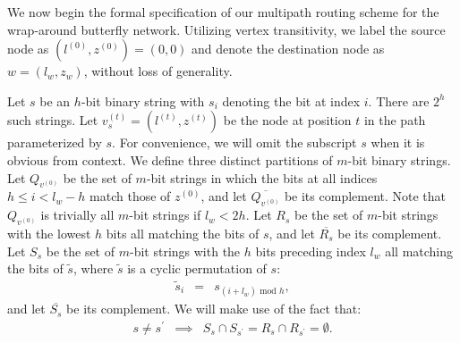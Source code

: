 \documentclass{sig-alternate-05-2015}
\newcommand{\beq}{\begin{eqnarray}}
\newcommand{\eeq}{\end{eqnarray}}
\begin{document}
We now begin the formal specification of our multipath routing scheme for the
wrap-around butterfly network.
Utilizing vertex transitivity, we label the source node as
$(l^{(0)}, z^{(0)}) = (0, 0)$ and denote the destination node as $w = (l_w, z_w)$,
without loss of generality.

Let $s$ be an $h$-bit binary string with $s_i$ denoting the bit at index $i$.
There are $2^h$ such strings.
Let $v_s^{(t)} = (l^{(t)}, z^{(t)})$ be the node at position $t$
in the path parameterized by $s$.
For convenience,
we will omit the subscript $s$ when it is obvious from context.
We define three distinct partitions of $m$-bit binary strings.
Let $Q_{v^{(0)}}$ be the set of $m$-bit
strings in which the bits at
all indices $h \leq i < l_w - h$ match those of $z^{(0)}$,
and let $\overline{Q_{v^{(0)}}}$ be its complement.
Note that $Q_{v^{(0)}}$ is trivially all $m$-bit strings if $l_w < 2h$.
Let $R_s$ be the set of $m$-bit strings with the lowest $h$
bits all matching the bits of $s$,
and let $\overline{R_s}$ be its complement.
Let $S_s$ be the set of $m$-bit strings with the $h$ bits
preceding index $l_w$ all matching the bits of $\tilde{s}$,
where $\tilde{s}$ is a cyclic permutation of $s$:
\beq
\tilde{s}_i &=& s_{(i + l_w) \text{ mod } h},
\eeq
and let $\overline{S_s}$ be its complement.
We will make use of the fact that:
\beq
s \neq s^\prime &\implies&
S_s \cap S_{s^\prime} = R_s \cap R_{s^\prime} = \emptyset.
\eeq
\end{document}

